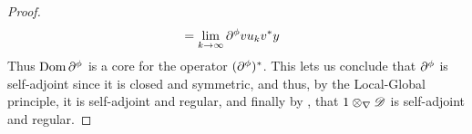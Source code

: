 \begin{proof}
\begin{align*}
		&=\lim_{k\to \infty} \part^\phi vu_k v^* y
	\end{align*}
	Thus $\dom \part^\phi$ is a core for the operator $(\part^\phi)^*$. This lets us conclude that $\part^\phi$ is self-adjoint since it is closed and symmetric, and thus, by the Local-Global principle, it is self-adjoint and regular, and finally by , that $1\otimes_\nabla \mathscr{D}$ is self-adjoint and regular. 
\end{proof}


